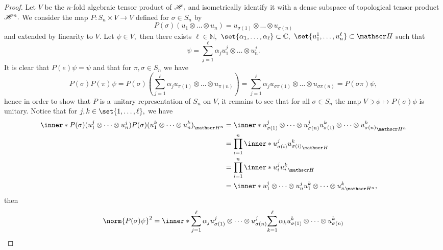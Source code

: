 \begin{proof}
    Let \(V\) be the \(n\)-fold algebraic tensor product of \(\mathscr{H},\) and isometrically identify it with a dense subspace of topological tensor product \(\mathscr{H}^n.\) We consider the map \(P : S_n \times V \to V\) defined for \(\sigma \in S_n\) by
    \begin{equation*}
        P(\sigma) \left(u_1 \otimes \dots \otimes u_n\right) = u_{\sigma(1)} \otimes \dots \otimes u_{\sigma(n)}
    \end{equation*}
    and extended by linearity to \(V\). Let \(\psi \in V,\) then there exists \(\ell \in \mathbb{N},\) \(\set{\alpha_1, \dots, \alpha_\ell} \subset \mathbb{C},\) \(\set{u_1^1, \dots, u_n^\ell} \subset \hilbert\) such that
    \begin{equation*}
        \psi = \sum_{j = 1}^\ell{\alpha_j u_1^j \otimes \dots \otimes u_n^j}.
    \end{equation*}
    It is clear that \(P(e) \psi = \psi\) and that for \(\pi, \sigma \in S_n\) we have
    \begin{equation*}
        P(\sigma) P(\pi) \psi = P(\sigma)\left(\sum_{j = 1}^\ell{\alpha_j u_{\pi(1)} \otimes \dots \otimes u_{\pi(n)}}\right)
        = \sum_{j = 1}^\ell{\alpha_j u_{\sigma\pi(1)} \otimes \dots \otimes u_{\sigma\pi(n)}} 
        = P(\sigma \pi) \psi,
    \end{equation*}
    hence in order to show that \(P\) is a unitary representation of \(S_n\) on \(V\), it remains to see that for all \(\sigma \in S_n\) the map \(V \ni \phi \mapsto P(\sigma) \phi\) is unitary. Notice that for \(j,k \in \set{1, \dots, \ell},\) we have
    \begin{align*}
        \inner*{P(\sigma) (u^j_1 \otimes \dots \otimes u^j_n)}{P(\sigma) (u^k_1 \otimes \dots \otimes u^k_n)}_{\hilbert^n} 
        &= \inner*{u^j_{\sigma(1)} \otimes \dots \otimes u^j_{\sigma(n)}}{u^k_{\sigma(1)} \otimes \dots \otimes u^k_{\sigma(n)}}_{\hilbert^n}\\
        &= \prod_{i = 1}^n \inner*{u^j_{\sigma(i)}}{u^k_{\sigma(i)}}_{\hilbert}\\
        &= \prod_{i = 1}^n \inner*{u^j_i}{u^k_i}_{\hilbert}\\
        &= \inner*{u^j_1 \otimes \dots \otimes u^j_n}{u^k_1 \otimes \dots \otimes u^k_n}_{\hilbert^n},
    \end{align*}
    then
    \begin{align*}
        \norm{P(\sigma)\psi}^2 &= \inner*{\sum_{j = 1}^\ell \alpha_j u_{\sigma(1)}^j \otimes \dots \otimes u_{\sigma(n)}^j}{\sum_{k = 1}^\ell \alpha_k u_{\sigma(1)}^k \otimes \dots \otimes u_{\sigma(n)}^k}\\

\end{align*}
\end{proof}
